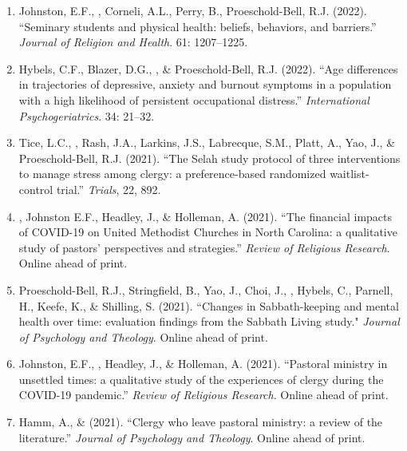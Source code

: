 \begin{enumerate}
\item Johnston, E.F., \Eagle, Corneli, A.L., Perry, B., Proeschold-Bell, R.J.  (2022). ``Seminary students and physical health: beliefs, behaviors, and barriers.'' \textit{Journal of Religion and Health}. 61: 1207--1225. 

\item Hybels, C.F., Blazer, D.G., \Eagle, \& Proeschold-Bell, R.J. (2022). ``Age differences in trajectories of depressive, anxiety and burnout symptoms in a population with a high likelihood of persistent occupational distress.'' \emph{International Psychogeriatrics}. 34: 21--32. 

\item Tice, L.C., \Eagle, Rash, J.A., Larkins, J.S., Labrecque, S.M., Platt, A., Yao, J., \& Proeschold-Bell, R.J. (2021). ``The Selah study protocol of three interventions to manage stress among clergy: a preference-based randomized waitlist-control trial.''  \textit{Trials}, 22, 892. 
	
\item \Eagle, Johnston E.F., Headley, J., \& Holleman, A. (2021). ``The financial impacts of COVID-19 on United Methodist Churches in North Carolina: a qualitative study of pastors’ perspectives and strategies.'' \emph{Review of Religious Research}. Online ahead of print. 

\item Proeschold-Bell, R.J., Stringfield, B., Yao, J., Choi, J., \Eagle, Hybels, C., Parnell, H., Keefe, K., \& Shilling, S. (2021). ``Changes in Sabbath-keeping and mental health over time: evaluation findings from the Sabbath Living study." \textit{Journal of Psychology and Theology}. Online ahead of print. 
	
\item Johnston, E.F., \Eagle, Headley, J., \& Holleman, A. (2021). ``Pastoral ministry in unsettled times: a qualitative study of the experiences of clergy during the COVID-19 pandemic.'' \textit{Review of Religious Research}. Online ahead of print. 

\item Hamm, A., \&  \Eagle \CF \hspace{.01em} (2021). ``Clergy who leave pastoral ministry: a review of the literature.'' \textit{Journal of Psychology and Theology}. Online ahead of print. 


\end{enumerate}
